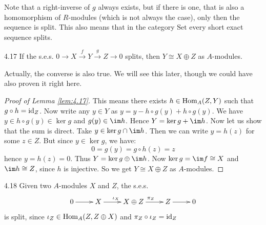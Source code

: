 \documentclass[twoside = false,	%
		headsepline,		%
		parskip = true,
		]{scrbook}						%
\begin{document}
    Note that a right-inverse of $g$ always exists, but if there is one, that is also a homomorphism of $R$-modules (which is not always the case), only then the sequence is split. This also means that in the category $\mathrm{Set}$ every short exact sequence splits.

    \begin{lemma}{}{4.17}
        If the s.e.s. $0 \to X \xrightarrow{f} Y \xrightarrow{g} Z \to 0$ splits, then $Y \cong X \oplus Z$ as $A$-modules.
    \end{lemma}
    Actually, the converse is also true. We will see this later, though we could have also proven it right here.
    \begin{proof}[Proof of Lemma \ref{lem:4.17}]
        This means there exists $h \in \mathrm{Hom}_A(Z,Y)$ such that $g \circ h = \mathrm{id}_Z$. Now write any $y \in Y$ as $y = y - h \circ g (y) + h \circ g (y)$. We have $y \in h \circ g (y) \in \ker g$ and $g(y) \in \im h$. Hence $Y = \ker g + \im h$. Now let us show that the sum is direct. Take $y \in \ker g \cap \im h$. Then we can write $y = h(z)$ for some $z \in Z$. But since $y \in \ker g$, we have:
        \begin{equation*}
            0 = g(y) = g \circ h (z) = z
        \end{equation*}
        hence $y = h(z) = 0$. Thus $Y = \ker g \oplus \im h$. Now $\ker g = \im f \cong X$ and $\im h \cong Z$, since $h$ is injective. So we get $Y \cong X \oplus Z$ as $A$-modules.
    \end{proof}

    \begin{example}{}{4.18}
        Given two $A$-modules $X$ and $Z$, the s.e.s.
        \begin{equation*}
            \xymatrix {
                0 \ar[r] & X \ar[r]^{\iota_X} & X \oplus Z \ar[r]^{\pi_Z} & Z \ar[r]& 0
            }
        \end{equation*}
        is split, since $\iota_Z \in \mathrm{Hom}_A(Z,Z \oplus X)$ and $\pi_Z \circ \iota_Z = \mathrm{id}_Z$
    \end{example}
\end{document}
